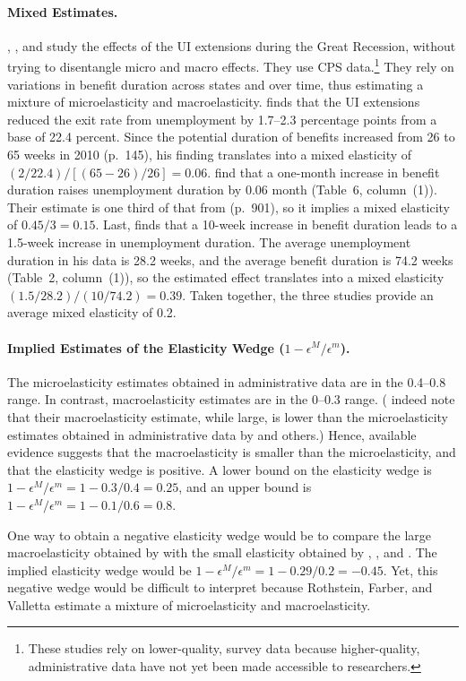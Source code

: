 \documentclass[letterpaper,12pt,leqno]{article}
\newcommand{\brk}[1]{\left[ #1 \right]}
\def \e{{\epsilon}}
\begin{document}
\paragraph{Mixed Estimates.} \citet{R11}, \citet{FV13}, and \citet{V14} study the effects of the UI extensions during the Great Recession, without trying to disentangle micro and macro effects. They use CPS data.\footnote{These studies rely on lower-quality, survey data because higher-quality, administrative data have not yet been made accessible to researchers.} They rely on variations in benefit duration across states and over time, thus estimating a mixture of microelasticity and macroelasticity. \citet[Table~3, columns~1--5]{R11} finds that the UI extensions reduced the exit rate from unemployment by 1.7--2.3 percentage points from a base of 22.4 percent. Since the potential duration of benefits increased from 26 to 65 weeks in 2010 (p.~145), his finding translates into a mixed elasticity of $(2/22.4)/\brk{(65-26)/26}=0.06$. \citet{FV13} find that a one-month increase in benefit duration raises unemployment duration by 0.06 month (Table~6, column~(1)). Their estimate is one third of that from \citet{KM90} (p.~901), so it implies a mixed elasticity of $0.45/3 = 0.15$. Last, \citet{V14} finds that a 10-week increase in benefit duration leads to a 1.5-week increase in unemployment duration. The average unemployment duration in his data is 28.2 weeks, and the average benefit duration is 74.2 weeks (Table~2, column~(1)), so the estimated effect translates into a mixed elasticity $(1.5/28.2)/(10/74.2)=0.39$. Taken together, the three studies provide an average mixed elasticity of 0.2.

\paragraph{Implied Estimates of the Elasticity Wedge ($1-\e^M/\e^m$).} The microelasticity estimates obtained in administrative data are in the 0.4--0.8 range. In contrast, macroelasticity estimates are in the 0--0.3 range. (\citet[p.~31]{HKM13} indeed note that their macroelasticity estimate, while large, is lower than the microelasticity estimates obtained in administrative data by \citet{KM90} and others.) Hence, available evidence suggests that the macroelasticity is smaller than the microelasticity, and that the elasticity wedge is positive. A lower bound on the elasticity wedge is $1-\e^M/\e^m = 1-0.3/0.4 = 0.25$, and an upper bound is $1-\e^M/\e^m = 1-0.1/0.6 = 0.8$. 

One way to obtain a negative elasticity wedge would be to compare the large macroelasticity obtained by \citet{HKM13} with the small elasticity obtained by \citet{R11}, \citet{FV13}, and \citet{V14}. The implied elasticity wedge would be $1-\e^M/\e^m = 1- 0.29/0.2 = - 0.45$. Yet, this negative wedge would be difficult to interpret because Rothstein, Farber, and Valletta estimate a mixture of microelasticity and macroelasticity. 
\end{document}
